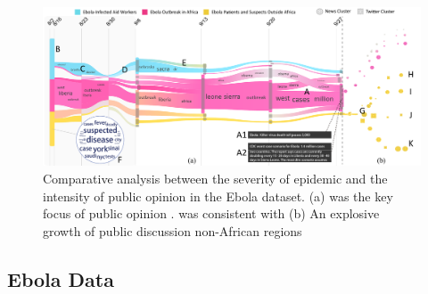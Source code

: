 \begin{figure}[t]
\centering
\centering
  \includegraphics[width=\linewidth]{fig/Teaser}
    \vspace{-3mm}
  \caption{
  Comparative analysis between the severity of  epidemic and the intensity of public opinion in the Ebola dataset.
  (a)   was the key focus of public opinion .
   was consistent with 
  (b) An explosive growth of public discussion  non-African regions 
  }
\label{fig:msoverview}
\vspace{-5mm}
\end{figure}
\subsection{Ebola Data}

